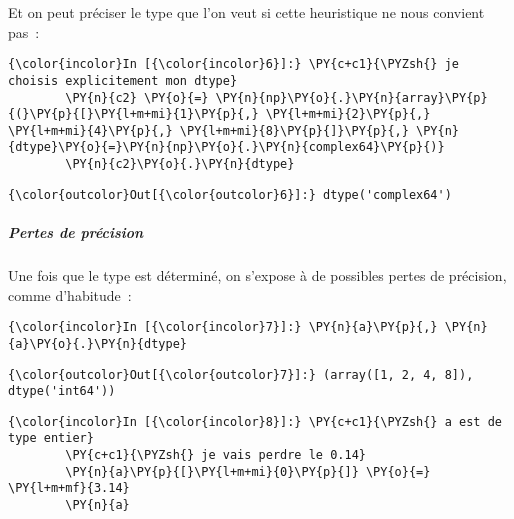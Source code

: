     Et on peut préciser le type que l'on veut si cette heuristique ne nous
convient pas~:

    \begin{Verbatim}[commandchars=\\\{\},frame=single,framerule=0.3mm,rulecolor=\color{cellframecolor}]
{\color{incolor}In [{\color{incolor}6}]:} \PY{c+c1}{\PYZsh{} je choisis explicitement mon dtype}
        \PY{n}{c2} \PY{o}{=} \PY{n}{np}\PY{o}{.}\PY{n}{array}\PY{p}{(}\PY{p}{[}\PY{l+m+mi}{1}\PY{p}{,} \PY{l+m+mi}{2}\PY{p}{,} \PY{l+m+mi}{4}\PY{p}{,} \PY{l+m+mi}{8}\PY{p}{]}\PY{p}{,} \PY{n}{dtype}\PY{o}{=}\PY{n}{np}\PY{o}{.}\PY{n}{complex64}\PY{p}{)}
        \PY{n}{c2}\PY{o}{.}\PY{n}{dtype}
\end{Verbatim}


\begin{Verbatim}[commandchars=\\\{\},frame=single,framerule=0.3mm,rulecolor=\color{cellframecolor}]
{\color{outcolor}Out[{\color{outcolor}6}]:} dtype('complex64')
\end{Verbatim}
            
    \hypertarget{pertes-de-pruxe9cision}{%
\subparagraph{Pertes de précision}\label{pertes-de-pruxe9cision}}

    Une fois que le type est déterminé, on s'expose à de possibles pertes de
précision, comme d'habitude~:

    \begin{Verbatim}[commandchars=\\\{\},frame=single,framerule=0.3mm,rulecolor=\color{cellframecolor}]
{\color{incolor}In [{\color{incolor}7}]:} \PY{n}{a}\PY{p}{,} \PY{n}{a}\PY{o}{.}\PY{n}{dtype}
\end{Verbatim}


\begin{Verbatim}[commandchars=\\\{\},frame=single,framerule=0.3mm,rulecolor=\color{cellframecolor}]
{\color{outcolor}Out[{\color{outcolor}7}]:} (array([1, 2, 4, 8]), dtype('int64'))
\end{Verbatim}
            
    \begin{Verbatim}[commandchars=\\\{\},frame=single,framerule=0.3mm,rulecolor=\color{cellframecolor}]
{\color{incolor}In [{\color{incolor}8}]:} \PY{c+c1}{\PYZsh{} a est de type entier}
        \PY{c+c1}{\PYZsh{} je vais perdre le 0.14}
        \PY{n}{a}\PY{p}{[}\PY{l+m+mi}{0}\PY{p}{]} \PY{o}{=} \PY{l+m+mf}{3.14}
        \PY{n}{a}
\end{Verbatim}


